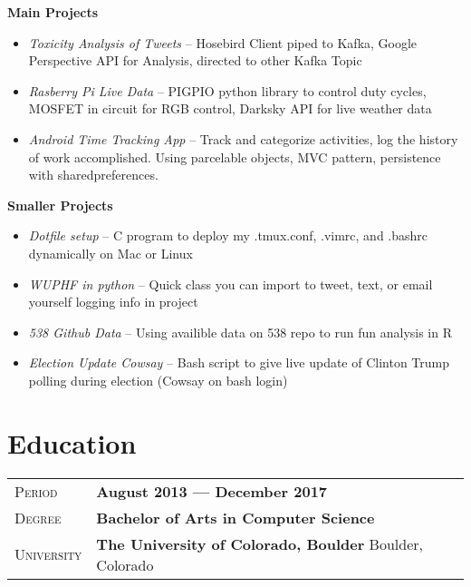\documentclass[a4paper, oneside, final]{scrartcl} %
\newcommand{\gray}{\rowcolor[gray]{.90}} %
\begin{document}
\begin{center}
      \begin{flushleft}
      \textbf{Main Projects}
      \begin{itemize}
      \item \textit{Toxicity Analysis of Tweets} -- Hosebird Client piped to Kafka, Google Perspective API for Analysis, directed to other Kafka Topic
      \item \textit{Rasberry Pi Live Data} -- PIGPIO python library to control duty cycles, MOSFET in circuit for RGB control, Darksky API for live weather data
      \item \textit{Android Time Tracking App} -- Track and categorize activities, log the history of work accomplished. Using parcelable objects, MVC pattern, persistence
        with sharedpreferences.
      \end{itemize}
      \vspace{5pt}
      \newpage
      \textbf{Smaller Projects}
      \begin{itemize}
      \item \textit{Dotfile setup} -- C program to deploy my .tmux.conf, .vimrc, and .bashrc dynamically on Mac or Linux
      \item \textit{WUPHF in python} -- Quick class you can import to tweet, text, or email yourself logging info in project
      \item \textit{538 Github Data} -- Using availible data on 538 repo to run fun analysis in R
      \item \textit{Election Update Cowsay} -- Bash script to give live update of Clinton Trump polling during election (Cowsay on bash login)
      \end{itemize}
      \end{flushleft}
      \vspace{5pt}






      \section{Education}

      \begin{tabularx}{0.97\linewidth}{>{\raggedleft\scshape}p{2cm}X}
      \gray Period & \textbf{August 2013 --- December 2017}\\
      \gray Degree & \textbf{Bachelor of Arts in Computer Science}\\
      \gray University & \textbf{The University of Colorado, Boulder} \hfill  Boulder, Colorado\\
      \end{tabularx}


\end{center}
\end{document}
